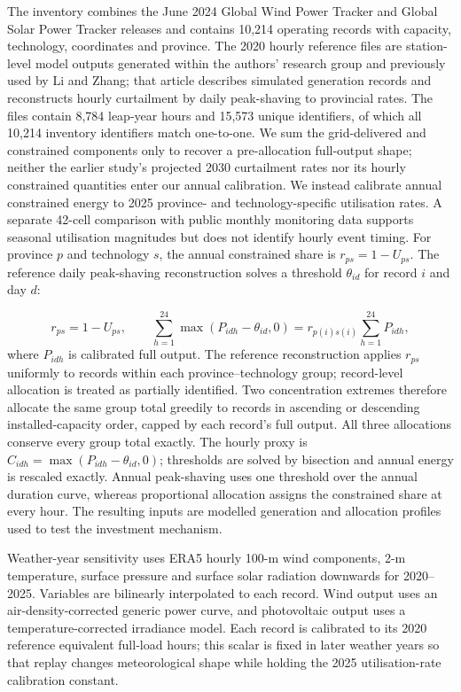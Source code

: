 \documentclass[pdflatex,sn-nature]{sn-jnl}
\begin{document}
The inventory combines the June 2024 Global Wind Power Tracker and Global Solar Power Tracker releases and contains 10,214 operating records with capacity, technology, coordinates and province\cite{gem2024}. The 2020 hourly reference files are station-level model outputs generated within the authors' research group and previously used by Li and Zhang\cite{li2026}; that article describes simulated generation records and reconstructs hourly curtailment by daily peak-shaving to provincial rates. The files contain 8,784 leap-year hours and 15,573 unique identifiers, of which all 10,214 inventory identifiers match one-to-one. We sum the grid-delivered and constrained components only to recover a pre-allocation full-output shape; neither the earlier study's projected 2030 curtailment rates nor its hourly constrained quantities enter our annual calibration. We instead calibrate annual constrained energy to 2025 province- and technology-specific utilisation rates\cite{renewable2025}. A separate 42-cell comparison with public monthly monitoring data supports seasonal utilisation magnitudes but does not identify hourly event timing\cite{renewablemonthly}. For province $p$ and technology $s$, the annual constrained share is $r_{ps}=1-U_{ps}$. The reference daily peak-shaving reconstruction solves a threshold $\theta_{id}$ for record $i$ and day $d$:

\begin{equation}
r_{ps}=1-U_{ps}, \qquad
\sum_{h=1}^{24}\max\!\left(P_{idh}-\theta_{id},0\right)
=r_{p(i)s(i)}\sum_{h=1}^{24}P_{idh},
\label{eq:curtailment}
\end{equation}
where $P_{idh}$ is calibrated full output. The reference reconstruction applies $r_{ps}$ uniformly to records within each province--technology group; record-level allocation is treated as partially identified. Two concentration extremes therefore allocate the same group total greedily to records in ascending or descending installed-capacity order, capped by each record's full output. All three allocations conserve every group total exactly. The hourly proxy is $C_{idh}=\max(P_{idh}-\theta_{id},0)$; thresholds are solved by bisection and annual energy is rescaled exactly. Annual peak-shaving uses one threshold over the annual duration curve, whereas proportional allocation assigns the constrained share at every hour. The resulting inputs are modelled generation and allocation profiles used to test the investment mechanism.

Weather-year sensitivity uses ERA5 hourly 100-m wind components, 2-m temperature, surface pressure and surface solar radiation downwards for 2020--2025\cite{hersbach2020,era5data}. Variables are bilinearly interpolated to each record. Wind output uses an air-density-corrected generic power curve, and photovoltaic output uses a temperature-corrected irradiance model. Each record is calibrated to its 2020 reference equivalent full-load hours; this scalar is fixed in later weather years so that replay changes meteorological shape while holding the 2025 utilisation-rate calibration constant.
\end{document}
